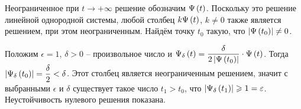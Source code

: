 \documentclass[a5paper,10pt]{article}
\begin{document}
Неограниченное при $t \to +\infty$ решение обозначим $\Psi\left(t\right)$. Поскольку это решение линейной однородной системы, любой столбец $k \Psi\left(t\right)$, $k \ne 0$ также является решением, при этом неограниченным. Найдём точку $t_{0}$ такую, что $\left|\Psi\left(t_{0}\right)\right| \ne 0$.

Положим $\epsilon = 1$, $\delta > 0$ -- произвольное число и $\Psi_{\delta}\left(t\right) =  \dfrac {\delta} {2\left|\Psi\left(t_{0}\right)\right|} \cdot \Psi\left(t\right)$. Тогда $\left|\Psi_{\delta}\left(t_{0}\right)\right| = \dfrac {\delta}  {2} < \delta$. Этот столбец является неограниченным решением, значит с выбранными $\epsilon$ и $\delta$ существует такое число $t_{1} > t_{0}$, что $\left|\Psi_{\delta}\left(t_{1}\right)\right| \geqslant 1 = \varepsilon$. Неустойчивость нулевого решения показана.
\end{document}
